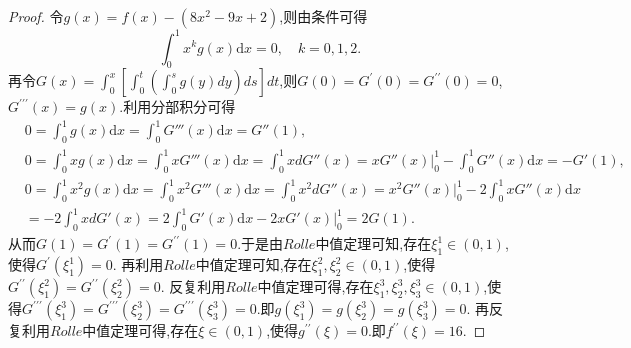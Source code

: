 \documentclass[../../main.tex]{subfiles}
\begin{document}
\begin{proof}
令\(g(x)=f(x)-(8x^2 - 9x + 2)\),则由条件可得
\[
\int_0^1 x^k g(x)\mathrm{d}x = 0, \quad k = 0,1,2.
\]
再令\(G(x)=\int_0^x\left[\int_0^t\left(\int_0^s g(y)dy\right)ds\right]dt\),则\(G(0)=G^\prime(0)=G^{\prime\prime}(0)=0\),\(G^{\prime\prime\prime}(x)=g(x)\).利用分部积分可得
\begin{align*}
&0=\int_0^1{g\left( x \right) \mathrm{d}x}=\int_0^1{G'''\left( x \right) \mathrm{d}x}=G''\left( 1 \right) ,
\\
&0=\int_0^1{xg\left( x \right) \mathrm{d}x}=\int_0^1{xG'''\left( x \right) \mathrm{d}x}=\int_0^1{xdG''\left( x \right)}=xG''\left( x \right) \Big |_{0}^{1}-\int_0^1{G''\left( x \right) \mathrm{d}x}=-G'\left( 1 \right) ,
\\
&0=\int_0^1{x^2g\left( x \right) \mathrm{d}x}=\int_0^1{x^2G'''\left( x \right) \mathrm{d}x}=\int_0^1{x^2dG''\left( x \right)}=x^2G''\left( x \right) \Big |_{0}^{1}-2\int_0^1{xG''\left( x \right) \mathrm{d}x}
\\
&=-2\int_0^1{xdG'\left( x \right)}=2\int_0^1{G'\left( x \right) \mathrm{d}x}-2xG'\left( x \right) \Big |_{0}^{1}=2G\left( 1 \right) .
\end{align*}
从而\(G(1)=G^\prime(1)=G^{\prime\prime}(1)=0\).于是由\(Rolle\)中值定理可知,存在\(\xi_1^1\in(0,1)\),使得\(G^\prime(\xi_1^1)=0\).
再利用\(Rolle\)中值定理可知,存在\(\xi_1^2,\xi_2^2\in(0,1)\),使得\(G^{\prime\prime}(\xi_1^2)=G^{\prime\prime}(\xi_2^2)=0\).
反复利用\(Rolle\)中值定理可得,存在\(\xi_1^3,\xi_2^3,\xi_3^3\in(0,1)\),使得\(G^{\prime\prime\prime}(\xi_1^3)=G^{\prime\prime\prime}(\xi_2^3)=G^{\prime\prime\prime}(\xi_3^3)=0\).即\(g(\xi_1^3)=g(\xi_2^3)=g(\xi_3^3)=0\).
再反复利用\(Rolle\)中值定理可得,存在\(\xi\in(0,1)\),使得\(g^{\prime\prime}(\xi)=0\).即\(f^{\prime\prime}(\xi)=16\).
\end{proof}
\end{document}
